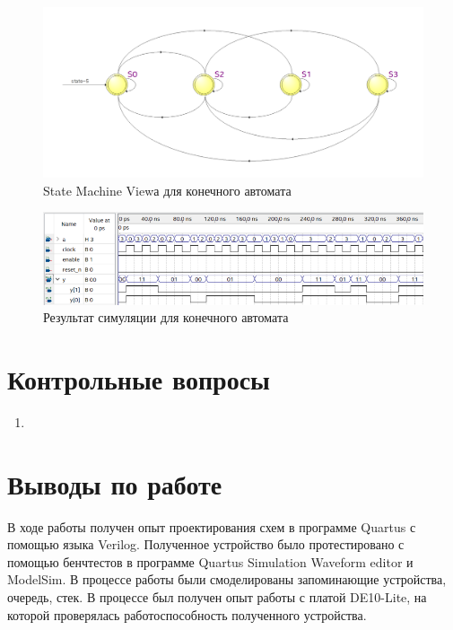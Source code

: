 \documentclass[a4paper,14pt]{article}
\begin{document}
	\begin{figure}[H]
		\centering
		\includegraphics[width=\linewidth]{images/extra_machine}
		\caption{State Machine Viewа для конечного автомата}
		\label{fig:extra_machine}
	\end{figure}

	\begin{figure}[H]
		\centering
		\includegraphics[width=\linewidth]{images/extra_sim}
		\caption{Результат симуляции для конечного автомата}
		\label{fig:extra_sim}
	\end{figure}

	\section{Контрольные вопросы}
	
	\begin{enumerate}
		\item 	
		
	\end{enumerate}
	
	\section{Выводы по работе}
	
	В ходе работы получен опыт проектирования схем в программе Quartus с помощью языка Verilog.
	Полученное устройство было протестировано с помощью бенчтестов в программе Quartus Simulation Waveform editor и ModelSim.
	В процессе работы были смоделированы запоминающие устройства, очередь, стек.
	В процессе был получен опыт работы с платой DE10-Lite, на которой проверялась работоспособность полученного устройства.
	
\end{document}
